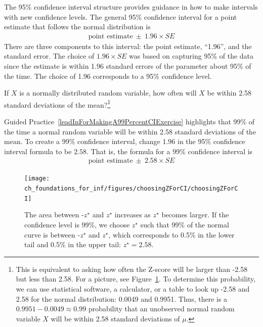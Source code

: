 The 95\% confidence interval structure provides guidance in how to
make intervals with new confidence levels. The general 95\% confidence
interval for a point estimate that follows the normal distribution is
\begin{eqnarray*}
\text{point estimate}\ \pm\ 1.96\times SE
\end{eqnarray*}
There are three components to this interval: the point estimate,
``1.96'', and the standard error. The choice of $1.96\times SE$ was
based on capturing 95\% of the data since the estimate is within
1.96 standard errors of the parameter about 95\% of the time.
The choice of 1.96 corresponds to a 95\% confidence level. 

\begin{exercise} \label{leadInForMakingA99PercentCIExercise}
If $X$ is a normally distributed random variable, how often will $X$
be within 2.58 standard deviations of the mean?\footnote{This is
equivalent to asking how often the Z-score will be larger than -2.58
but less than 2.58.
For a picture, see Figure~\ref{choosingZForCI}.
To determine this probability, we can use statistical software,
a calculator, or a table to look up -2.58 and 2.58 for the normal
distribution: 0.0049 and 0.9951. Thus, there is a
$0.9951-0.0049 \approx 0.99$ probability that
an unobserved normal random variable
$X$ will be within 2.58 standard deviations of $\mu$.}
\end{exercise}

Guided Practice~\ref{leadInForMakingA99PercentCIExercise} highlights
that 99\% of the time a normal random variable will be within
2.58 standard deviations of the mean.
To create a 99\% confidence interval, change 1.96 in the 95\%
confidence interval formula to be $2.58$.
That is, the formula
for a 99\% confidence interval is
\begin{align*}
\text{point estimate}\ \pm\ 2.58\times SE
\end{align*}

\begin{figure}
  \centering
  \texttt{[image: ch\_foundations\_for\_inf/figures/choosingZForCI/choosingZForCI]}
  \caption{The area between -$z^{\star}$ and $z^{\star}$ increases as
      $z^{\star}$ becomes larger. If the confidence level is 99\%,
      we choose $z^{\star}$ such that 99\% of the normal curve is
      between -$z^{\star}$ and $z^{\star}$, which corresponds to 0.5\%
      in the lower tail and 0.5\% in the upper tail: $z^{\star}=2.58$.}
\label{choosingZForCI}
\end{figure}


